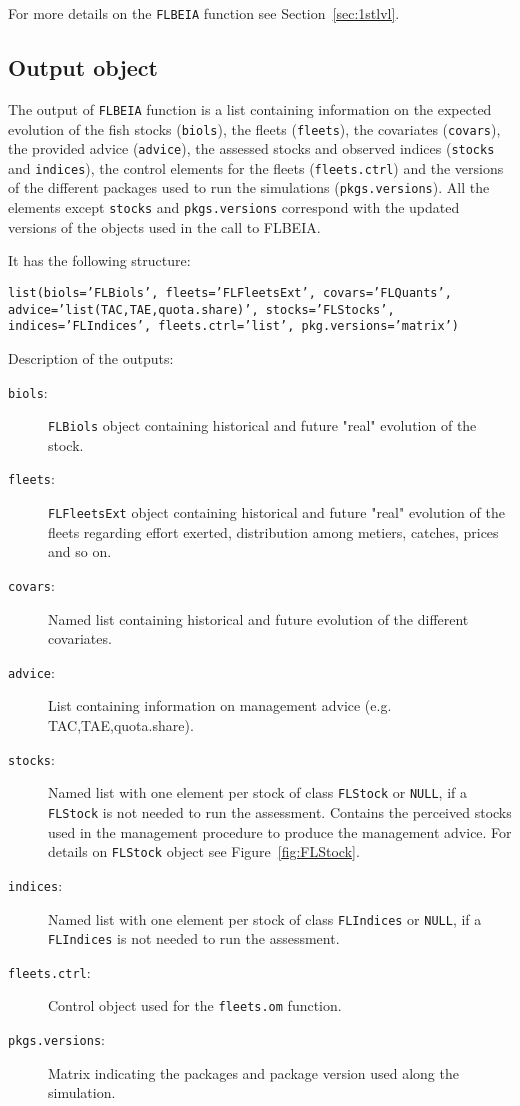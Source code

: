   For more details on the \texttt{FLBEIA} function see Section~\ref{sec:1stlvl}.

\subsection{Output object}

  The output of \texttt{FLBEIA} function is a list containing information on the expected evolution of the fish stocks (\texttt{biols}), the fleets 
  (\texttt{fleets}), the covariates (\texttt{covars}), the provided advice (\texttt{advice}), the assessed stocks and observed indices 
  (\texttt{stocks} and \texttt{indices}), the control elements for the fleets (\texttt{fleets.ctrl}) and the versions of the different packages
  used to run the simulations (\texttt{pkgs.versions}). All the elements except \texttt{stocks} and \texttt{pkgs.versions} correspond with the
  updated versions of the objects used in the call to FLBEIA. 
  
  \noindent It has the following structure:
  \begin{center}
    \texttt{list(biols='FLBiols', fleets='FLFleetsExt', covars='FLQuants', advice='list(TAC,TAE,quota.share)', 
            stocks='FLStocks', indices='FLIndices', fleets.ctrl='list', pkg.versions='matrix') }
  \end{center}
  
  \noindent Description of the outputs:
    \begin{description}
      \item[\texttt{biols}:] \texttt{FLBiols} object containing historical and future "real" evolution of the stock.     
      \item[\texttt{fleets}:] \texttt{FLFleetsExt} object containing historical and future "real" evolution of the fleets 
  regarding effort exerted, distribution among metiers, catches, prices and so on.
      \item[\texttt{covars}:] Named list containing historical and future evolution of the different covariates.     
      \item[\texttt{advice}:] List containing information on management advice (e.g. TAC,TAE,quota.share).     
      \item[\texttt{stocks}:] Named list with one element per stock of class \texttt{FLStock} or \texttt{NULL}, if a \texttt{FLStock} is not needed to run the assessment.
          Contains the perceived stocks used in the management procedure to produce the management advice.
          For details on \texttt{FLStock} object see Figure~\ref{fig:FLStock}.
      \item[\texttt{indices}:] Named list with one element per stock of class \texttt{FLIndices} or \texttt{NULL}, if a \texttt{FLIndices} is not needed to run the assessment. 
      \item[\texttt{fleets.ctrl}:] Control object used for the \texttt{fleets.om} function.
      \item[\texttt{pkgs.versions}:] Matrix indicating the packages and package version used along the simulation.
    \end{description}
